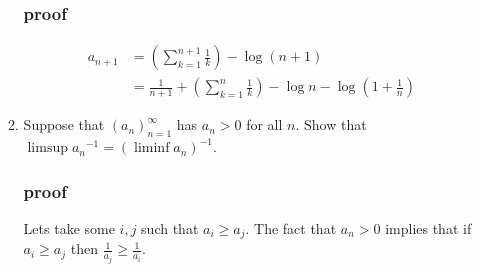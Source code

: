 \documentclass[letterpaper]{article}
\begin{document}
\begin{enumerate}
\begin{enumerate}
  \subsubsection*{proof}
  \begin{align*}
    a_{n+1}&=\left(\sum\limits_{k=1}^{n+1}{\frac{1}{k}}\right)-\log (n+1)\\
    &=\frac{1}{n+1}+\left(\sum\limits_{k=1}^{n}{\frac{1}{k}}\right)-\log n-\log \left(1+\frac{1}{n}\right)
  \end{align*}
  \setcounter{enumii}{12}
  \item
  Suppose that $(a_n)_{n=1}^\infty$ has $a_n>0$ for all $n$. Show that $\limsup {a_n}^{-1}=(\liminf a_n)^{-1}$.
  \subsubsection*{proof}
  Lets take some $i,j$ such that $a_i\ge a_j$.
  The fact that $a_n>0$ implies that if $a_i\ge a_j$ then $\frac{1}{a_j}\ge \frac{1}{a_i}$.

  \end{enumerate}
\end{enumerate}
\end{document}
